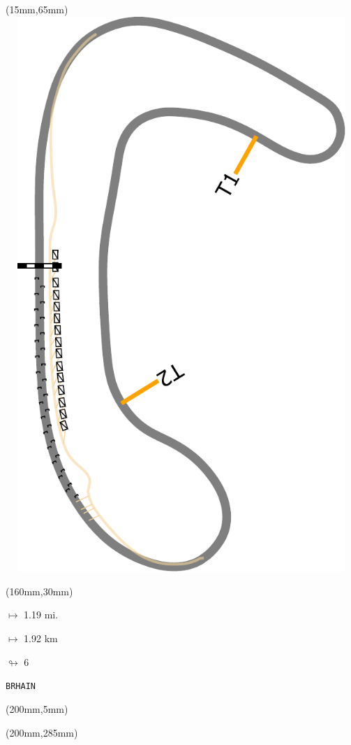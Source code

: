 \begin{textblock*}{185mm}(15mm,65mm)%
\centering
\mbox{\includegraphics[width=185mm,height=210mm,keepaspectratio]{PT/BRHAIN.pdf}}
\end{textblock*}
\begin{textblock*}{40mm}(160mm,30mm)%
\Large
\par$\mapsto$ 1.19 mi.
\par$\mapsto$ 1.92 km
\par$\looparrowright$ 6
\par\hfill\tiny\tt BRHAIN\\
\end{textblock*}
\begin{textblock*}{20mm}(200mm,5mm)%
\fbox{\thepage}
\label{BRHAIN}
\end{textblock*}
\begin{textblock*}{20mm}(200mm,285mm)%
\fbox{\thepage}
\end{textblock*}

